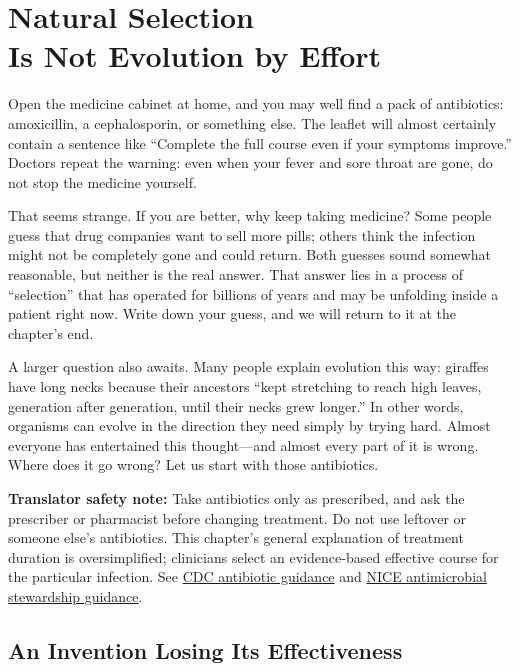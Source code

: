 \chapter[Natural Selection Is Not Evolution by Effort]{Natural Selection\protect\\ Is Not Evolution by Effort}

\begin{kaichang}
Open the medicine cabinet at home, and you may well find a pack of antibiotics: amoxicillin, a cephalosporin, or something else. The leaflet will almost certainly contain a sentence like ``Complete the full course even if your symptoms improve.'' Doctors repeat the warning: even when your fever and sore throat are gone, do not stop the medicine yourself.

That seems strange. If you are better, why keep taking medicine? Some people guess that drug companies want to sell more pills; others think the infection might not be completely gone and could return. Both guesses sound somewhat reasonable, but neither is the real answer. That answer lies in a process of ``selection'' that has operated for billions of years and may be unfolding inside a patient right now. Write down your guess, and we will return to it at the chapter's end.

A larger question also awaits. Many people explain evolution this way: giraffes have long necks because their ancestors ``kept stretching to reach high leaves, generation after generation, until their necks grew longer.'' In other words, organisms can evolve in the direction they need simply by trying hard. Almost everyone has entertained this thought---and almost every part of it is wrong. Where does it go wrong? Let us start with those antibiotics.
\end{kaichang}

\textbf{Translator safety note:} Take antibiotics only as prescribed, and ask the prescriber or pharmacist before changing treatment. Do not use leftover or someone else's antibiotics. This chapter's general explanation of treatment duration is oversimplified; clinicians select an evidence-based effective course for the particular infection. See \href{https://www.cdc.gov/antibiotic-use/about/}{CDC antibiotic guidance} and \href{https://www.nice.org.uk/guidance/ng15/evidence/full-guideline-pdf-252320799}{NICE antimicrobial stewardship guidance}.

\section{An Invention Losing Its Effectiveness}

